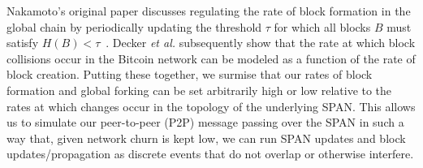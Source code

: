 Nakamoto's original paper discusses regulating the rate of block formation in
the global chain by
periodically updating the threshold $\tau$ for which all blocks $B$
must satisfy $H(B)<\tau$~\cite{nakamoto2008bitcoin}.
Decker \textit{et al.} subsequently show that the rate at which block collisions
occur in the Bitcoin network can be modeled as a function of the rate of block
creation. Putting these together, we surmise that our rates of block formation
and global forking can be set arbitrarily high or low relative to the rates at
which changes occur in the topology of the underlying SPAN. This allows us to
simulate our peer-to-peer (P2P) message passing over the SPAN in such
a way that, given network churn is kept low, we can run SPAN updates and
block updates/propagation as discrete events that do not overlap or otherwise
interfere.

